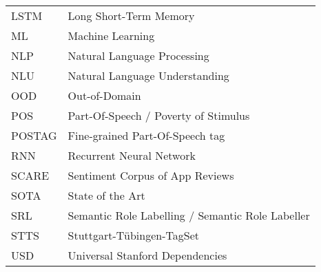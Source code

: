 \begin{supertabular}{lp{12.5cm}}
LSTM    & Long Short-Term Memory\\
ML      & Machine Learning\\
NLP     & Natural Language Processing\\
NLU     & Natural Language Understanding\\
OOD     & Out-of-Domain\\
POS     & Part-Of-Speech / Poverty of Stimulus\\
POSTAG  & Fine-grained Part-Of-Speech tag\\
RNN     & Recurrent Neural Network\\
SCARE   & Sentiment Corpus of App Reviews\\
SOTA    & State of the Art\\
SRL     & Semantic Role Labelling / Semantic Role Labeller\\
STTS    & Stuttgart-Tübingen-TagSet\\
USD     & Universal Stanford Dependencies\\
\end{supertabular}

\newpage
